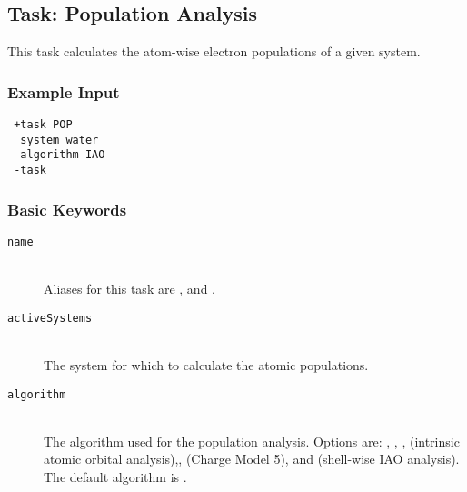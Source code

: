 \subsection{Task: Population Analysis}
This task calculates the atom-wise electron populations of a given system.
\subsubsection{Example Input}
\begin{lstlisting}
 +task POP
  system water
  algorithm IAO
 -task
\end{lstlisting}

\subsubsection{Basic Keywords}
\begin{description}
 \item [\texttt{name}]\hfill \\
  Aliases for this task are ,  and .
 \item [\texttt{activeSystems}]\hfill \\
  The system for which to calculate the atomic populations.
 \item [\texttt{algorithm}]\hfill \\
  The algorithm used for the population analysis.
  Options are: , , ,  (intrinsic atomic orbital analysis),,  (Charge Model 5), and  (shell-wise IAO analysis). The default algorithm is .
\end{description}
